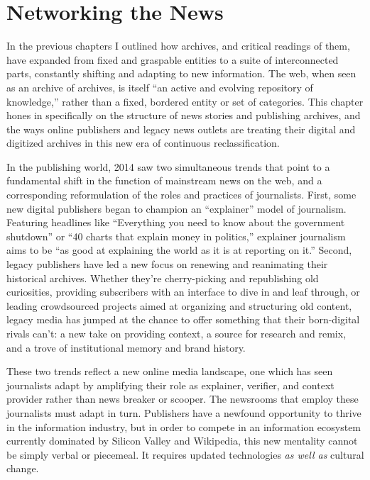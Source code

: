 \chapter{Networking the News}

In the previous chapters I outlined how archives, and critical readings of them, have expanded from fixed and graspable entities to a suite of interconnected parts, constantly shifting and adapting to new information. The web, when seen as an archive of archives, is itself ``an active and evolving repository of knowledge,'' rather than a fixed, bordered entity or set of categories.\autocite[2]{chakrabarti_mining_2003} This chapter hones in specifically on the structure of news stories and publishing archives, and the ways online publishers and legacy news outlets are treating their digital and digitized archives in this new era of continuous reclassification.

In the publishing world, 2014 saw two simultaneous trends that point to a fundamental shift in the function of mainstream news on the web, and a corresponding reformulation of the roles and practices of journalists. First, some new digital publishers began to champion an ``explainer'' model of journalism. Featuring headlines like ``Everything you need to know about the government shutdown'' or ``40 charts that explain money in politics,'' explainer journalism aims to be ``as good at explaining the world as it is at reporting on it.''\autocite{klein_vox_2014} Second, legacy publishers have led a new focus on renewing and reanimating their historical archives. Whether they're cherry-picking and republishing old curiosities, providing subscribers with an interface to dive in and leaf through, or leading crowdsourced projects aimed at organizing and structuring old content, legacy media has jumped at the chance to offer something that their born-digital rivals can't: a new take on providing context, a source for research and remix, and a trove of institutional memory and brand history.

These two trends reflect a new online media landscape, one which has seen journalists adapt by amplifying their role as explainer, verifier, and context provider rather than news breaker or scooper. The newsrooms that employ these journalists must adapt in turn. Publishers have a newfound opportunity to thrive in the information industry, but in order to compete in an information ecosystem currently dominated by Silicon Valley and Wikipedia, this new mentality cannot be simply verbal or piecemeal. It requires updated technologies \emph{as well as} cultural change.

